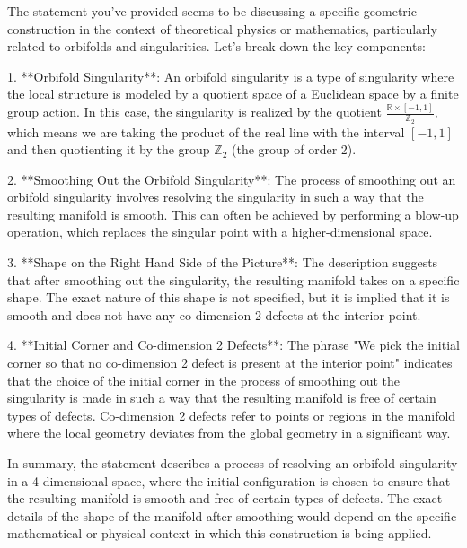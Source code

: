 The statement you've provided seems to be discussing a specific geometric construction in the context of theoretical physics or mathematics, particularly related to orbifolds and singularities. Let's break down the key components:

1. **Orbifold Singularity**: An orbifold singularity is a type of singularity where the local structure is modeled by a quotient space of a Euclidean space by a finite group action. In this case, the singularity is realized by the quotient \(\frac{\mathbb{R} \times [-1,1]}{\mathbb{Z}_2}\), which means we are taking the product of the real line with the interval \([-1,1]\) and then quotienting it by the group \(\mathbb{Z}_2\) (the group of order 2).

2. **Smoothing Out the Orbifold Singularity**: The process of smoothing out an orbifold singularity involves resolving the singularity in such a way that the resulting manifold is smooth. This can often be achieved by performing a blow-up operation, which replaces the singular point with a higher-dimensional space.

3. **Shape on the Right Hand Side of the Picture**: The description suggests that after smoothing out the singularity, the resulting manifold takes on a specific shape. The exact nature of this shape is not specified, but it is implied that it is smooth and does not have any co-dimension 2 defects at the interior point.

4. **Initial Corner and Co-dimension 2 Defects**: The phrase "We pick the initial corner so that no co-dimension 2 defect is present at the interior point" indicates that the choice of the initial corner in the process of smoothing out the singularity is made in such a way that the resulting manifold is free of certain types of defects. Co-dimension 2 defects refer to points or regions in the manifold where the local geometry deviates from the global geometry in a significant way.

In summary, the statement describes a process of resolving an orbifold singularity in a 4-dimensional space, where the initial configuration is chosen to ensure that the resulting manifold is smooth and free of certain types of defects. The exact details of the shape of the manifold after smoothing would depend on the specific mathematical or physical context in which this construction is being applied.
